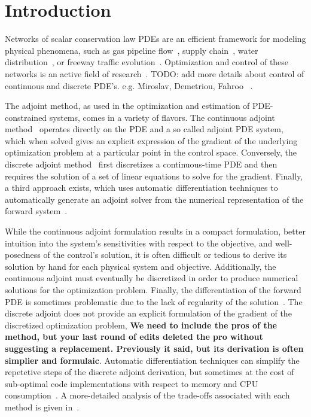 \section{Introduction} %
\label{sec:introduction}

Networks of scalar conservation law PDEs are an efficient framework for modeling physical phenomena, such as gas pipeline flow~\cite{Rothfarb1970}, supply chain~\cite{Brunnermeier1999}, water distribution~\cite{Nguyen}, or freeway traffic evolution~\cite{garavello2006traffic,work2010traffic}. Optimization and control of these networks is an active field of research~\cite{Gugat2005,Bayen2006,Kotsialos2004}. TODO: add more details about control of continuous and discrete PDE's. e.g. Miroslav, Demetriou, Fahroo ~\cite{Fahroo2000,Krstic2008}.

The adjoint method, as used in the optimization and estimation of PDE-constrained systems, comes in a variety of flavors. The continuous adjoint method~\cite{Jacquet2005,Gugat2005,Moin1994,Reuther1996} operates directly on the PDE and a so called adjoint PDE system, which when solved gives an explicit expression of the gradient of the underlying optimization problem at a particular point in the control space. Conversely, the discrete adjoint method~\cite{Giles2000,Gugat2005,Kotsialos2004} first discretizes a continuous-time PDE and then requires the solution of a set of linear equations to solve for the gradient. Finally, a third approach exists, which uses automatic differentiation techniques to automatically generate an adjoint solver from the numerical representation of the forward system~\cite{Muller2005,Giering1998}.

While the continuous adjoint formulation results in a compact formulation, better intuition into the system's sensitivities with respect to the objective, and well-posedness of the control's solution, it is often difficult or tedious to derive its solution by hand for each physical system and objective. Additionally, the continuous adjoint must eventually be discretized in order to produce numerical solutions for the optimization problem. Finally, the differentiation of the forward PDE is sometimes problematic due to the lack of regularity of the solution~\cite{work2010traffic,garavello2006traffic}. The discrete adjoint does not provide an explicit formulation of the gradient of the discretized optimization problem, \textbf{We need to include the pros of the method, but your last round of edits deleted the pro without suggesting a replacement. Previously it said, but its derivation is often simplier and formulaic}. Automatic differentiation techniques can simplify the repetetive steps of the discrete adjoint derivation, but sometimes at the cost of sub-optimal code implementations with respect to memory and CPU consumption~\cite{Giles}. A more-detailed analysis of the trade-offs associated with each method is given in~\cite{Giles}.

